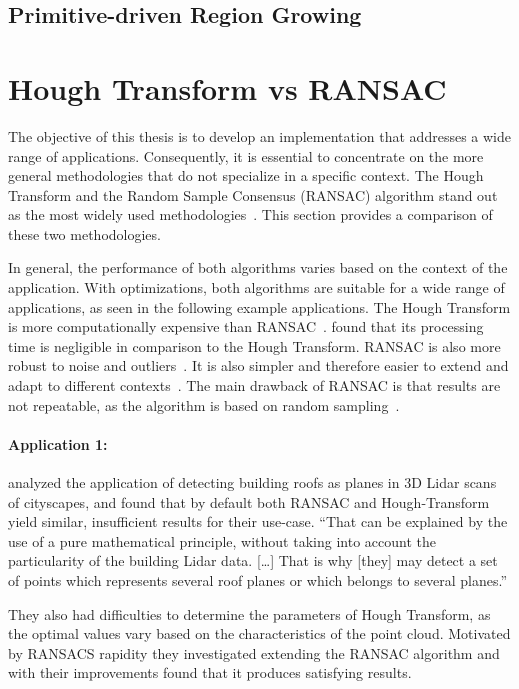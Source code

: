 \subsection{Primitive-driven Region Growing}

\section{Hough Transform vs RANSAC}
The objective of this thesis is to develop an implementation that addresses a wide range of applications.
Consequently, it is essential to concentrate on the more general methodologies that do not specialize in a specific context.
The Hough Transform and the Random Sample Consensus (RANSAC) algorithm stand out as the most widely used methodologies~\parencite{schnabel_efficient_2007}.
This section provides a comparison of these two methodologies.

In general, the performance of both algorithms varies based on the context of the application.
With optimizations, both algorithms are suitable for a wide range of applications, as seen in the following example applications.
The Hough Transform is more computationally expensive than RANSAC~\parencite{kaiser_survey_2019}.
\cite{tarsha-kurdi_hough-transform_2007} found that its processing time is negligible in comparison to the Hough Transform.
RANSAC is also more robust to noise and outliers~\parencite{kaiser_survey_2019}.
It is also simpler and therefore easier to extend and adapt to different contexts~\parencite{tarsha-kurdi_hough-transform_2007, kaiser_survey_2019}.
The main drawback of RANSAC is that results are not repeatable, as the algorithm is based on random sampling~\parencite{kaiser_survey_2019}.


\paragraph{Application 1:}
\cite{tarsha-kurdi_hough-transform_2007} analyzed the application of detecting building
roofs as planes in 3D Lidar scans of cityscapes, and found that by default both RANSAC and Hough-Transform yield similar,
insufficient results for their use-case.
“That can be explained by the use of a pure mathematical principle,
without taking into account the particularity of the building Lidar data. […] That is why
[they] may detect a set of points which represents several roof planes or which belongs to several planes.”

They also had difficulties to determine the parameters of Hough Transform,
as the optimal values vary based on the characteristics of the point cloud.
Motivated by RANSACS rapidity they investigated extending the RANSAC algorithm and with their improvements
found that it produces satisfying results.

